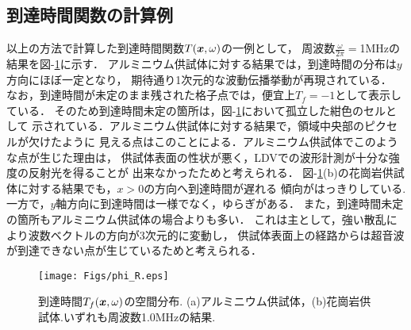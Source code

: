 \subsection{到達時間関数の計算例}
以上の方法で計算した到達時間関数$T(\mbox{\boldmath{$x$}},\omega)$の一例として，
周波数$\frac{\omega}{2\pi}=$1MHzの結果を図-\ref{fig:fig12}に示す． 
アルミニウム供試体に対する結果では，到達時間の分布は$y$方向にほぼ一定となり，
期待通り1次元的な波動伝播挙動が再現されている．
なお，到達時間が未定のまま残された格子点では，便宜上$T_f=-1$として表示している．
そのため到達時間未定の箇所は，図-\ref{fig:fig12}において孤立した紺色のセルとして
示されている．アルミニウム供試体に対する結果で，領域中央部のピクセルが欠けたように
見える点はこのことによる．アルミニウム供試体でこのような点が生じた理由は，
供試体表面の性状が悪く，LDVでの波形計測が十分な強度の反射光を得ることが
出来なかったためと考えられる．
図-\ref{fig:fig12}(b)の花崗岩供試体に対する結果でも，$x>0$の方向へ到達時間が遅れる
傾向がはっきりしている.一方で，$y$軸方向に到達時間は一様でなく，ゆらぎがある．
また，到達時間未定の箇所もアルミニウム供試体の場合よりも多い．
これは主として，強い散乱により波数ベクトルの方向が3次元的に変動し，
供試体表面上の経路からは超音波が到達できない点が生じているためと考えられる．
\begin{figure}
\begin{center}
	\texttt{[image: Figs/phi\_R.eps]}
	\caption{到達時間$T_f(\mbox{\boldmath{$x$}},\omega)$の空間分布. 
	(a)アルミニウム供試体，(b)花崗岩供試体.いずれも周波数1.0MHzの結果.}
	\label{fig:fig12}
\end{center}
	\vspace{-5mm}
\end{figure}
